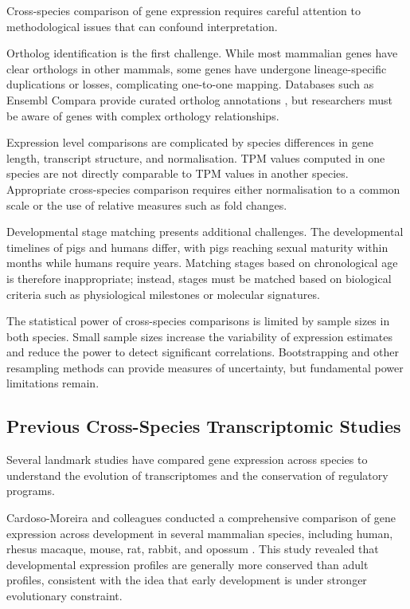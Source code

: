 Cross-species comparison of gene expression requires careful attention to methodological issues that can confound interpretation.

Ortholog identification is the first challenge. While most mammalian genes have clear orthologs in other mammals, some genes have undergone lineage-specific duplications or losses, complicating one-to-one mapping. Databases such as Ensembl Compara provide curated ortholog annotations \parencite{cunningham_ensembl_2022}, but researchers must be aware of genes with complex orthology relationships.

Expression level comparisons are complicated by species differences in gene length, transcript structure, and normalisation. TPM values computed in one species are not directly comparable to TPM values in another species. Appropriate cross-species comparison requires either normalisation to a common scale or the use of relative measures such as fold changes.

Developmental stage matching presents additional challenges. The developmental timelines of pigs and humans differ, with pigs reaching sexual maturity within months while humans require years. Matching stages based on chronological age is therefore inappropriate; instead, stages must be matched based on biological criteria such as physiological milestones or molecular signatures.

The statistical power of cross-species comparisons is limited by sample sizes in both species. Small sample sizes increase the variability of expression estimates and reduce the power to detect significant correlations. Bootstrapping and other resampling methods can provide measures of uncertainty, but fundamental power limitations remain.

\subsection{Previous Cross-Species Transcriptomic Studies}

Several landmark studies have compared gene expression across species to understand the evolution of transcriptomes and the conservation of regulatory programs.

Cardoso-Moreira and colleagues conducted a comprehensive comparison of gene expression across development in several mammalian species, including human, rhesus macaque, mouse, rat, rabbit, and opossum \parencite{cardoso-moreira_gene_2019}. This study revealed that developmental expression profiles are generally more conserved than adult profiles, consistent with the idea that early development is under stronger evolutionary constraint.

